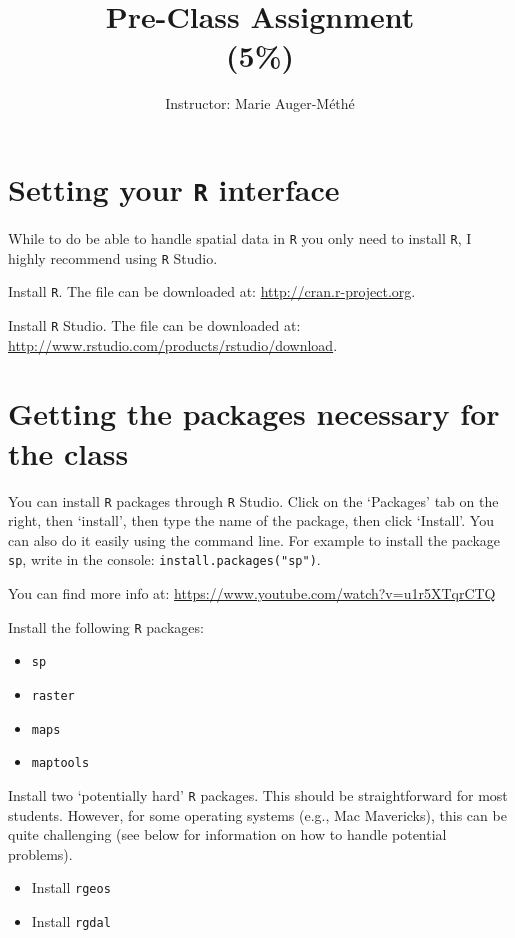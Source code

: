 \documentclass[11pt, oneside]{article}   	%
\title{Pre-Class Assignment \\ \large(5\%)}
\author{Instructor: Marie Auger-M\'eth\'e}
\date{}							%
\begin{document}
\maketitle

\section{Setting your \texttt{R} interface}

While to do be able to handle spatial data in \texttt{R} you only need to install \texttt{R}, I highly recommend using \texttt{R} Studio.

\begin{Exercise}

\Question Install \texttt{R}. The file can be downloaded at: \url{http://cran.r-project.org}. 

\Question Install \texttt{R} Studio. The file can be downloaded at:
\url{http://www.rstudio.com/products/rstudio/download}. 

\end{Exercise}

\section{Getting the packages necessary for the class}

You can install \texttt{R} packages through \texttt{R} Studio. Click on the `Packages' tab on the right, then `install', then type the name of the package, then click `Install'. You can also do it easily using the command line.  For example to install the package \texttt{sp}, write in the console: \texttt{install.packages("sp")}.

You can find more info at: \url{https://www.youtube.com/watch?v=u1r5XTqrCTQ}

\begin{Exercise}[label=easyPackages]
\Question Install the following \texttt{R} packages:
\begin{itemize}
	\item \texttt{sp} 
	\item \texttt{raster} 
	\item \texttt{maps} 
	\item \texttt{maptools} 
\end{itemize}
\end{Exercise}

\begin{Exercise}

\Question Install two 	`potentially hard' \texttt{R} packages. This should be straightforward for most students. However, for some operating systems (e.g., Mac Mavericks), this can be quite challenging (see below for information on how to handle potential problems). 
\begin{itemize}
	\item Install \texttt{rgeos}	
	\item Install \texttt{rgdal}	
\end{itemize}
\end{Exercise}
\end{document}
